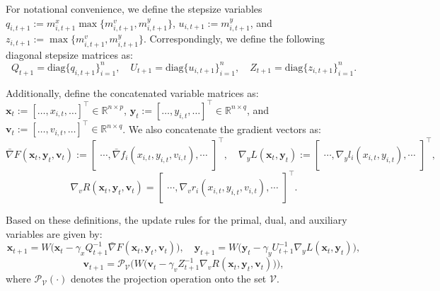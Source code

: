 \documentclass{article}
\theoremstyle{plain}
\theoremstyle{definition}
\theoremstyle{remark}
\begin{document}
For notational convenience, we define the stepsize variables $q_{i,t+1} := m^x_{i,t+1}\max \big\{m^v_{i,t+1}, m^y_{i,t+1}\big\}$, $u_{i,t+1} := m^y_{i,t+1}$, and $z_{i,t+1} := \max \big\{m^v_{i,t+1}, m^y_{i,t+1}\big\}$. Correspondingly, we define the following diagonal stepsize matrices as: 
{\setlength{\abovedisplayskip}{2pt}
\setlength{\belowdisplayskip}{1pt}
\begin{equation*}\label{eq8}
    Q_{t+1} = \text{diag} \big\{q_{i,t+1}\big\}_{i=1}^n, \quad 
U_{t+1} = \text{diag} \big\{u_{i,t+1}\big\}_{i=1}^n,\quad Z_{t+1}= \text{diag} \big\{z_{i,t+1}\big\}_{i=1}^n.\nonumber
\end{equation*}}

Additionally, define the concatenated variable matrices as: $\mathbf{x}_t \!\!:=\!\! [\dots, x_{i,t},\dots]^\top \!\!\!\in\!\! \mathbb{R}^{n \times p}$, $\mathbf{y}_t \!\!:=\!\! [\dots, y_{i,t},\dots]^\top \!\!\!\in\!\! \mathbb{R}^{n \!\times q}$, and $\mathbf{v}_t\! \!:=\!\! [\dots, v_{i,t},\dots]^\top \!\!\!\in\!\! \mathbb{R}^{n \!\times q}$. We also concatenate the gradient vectors as:
{\setlength{\abovedisplayskip}{3pt}
\setlength{\belowdisplayskip}{2pt}
\begin{equation*}
    \bar{\nabla} {F}(\mathbf{x}_t, \mathbf{y}_t, \mathbf{v}_t) :=
    \begin{bmatrix}
         \cdots, \bar{\nabla}f_i(x_{i,t}, y_{i,t}, v_{i,t}),\cdots
    \end{bmatrix}^\top,\quad
    \nabla_y {L}(\mathbf{x}_t, \mathbf{y}_t) :=
    \begin{bmatrix}
        \cdots,  \nabla_yl_i(x_{i,t}, y_{i,t}),\cdots
    \end{bmatrix}^\top,
\end{equation*}
\begin{equation*}
    \!\nabla_v {R}(\mathbf{x}_t, \mathbf{y}_t, \mathbf{v}_t) =
    \begin{bmatrix}
        \cdots,\nabla_v r_i(x_{i,t}, y_{i,t}, v_{i,t}),\cdots
    \end{bmatrix}^\top.
\end{equation*}}

Based on these definitions, the update rules for the primal, dual, and auxiliary variables are given by:
\begin{equation*}
\mathbf{x}_{t+1} = W \Big(\mathbf{x}_t - \gamma_x Q_{t+1}^{-1} \bar{\nabla} F(\mathbf{x}_t, \mathbf{y}_t,\mathbf{v}_t)\Big), \quad
\mathbf{y}_{t+1} = W \big(\mathbf{y}_t - \gamma_y U_{t+1}^{-1} \nabla_y L(\mathbf{x}_t, \mathbf{y}_t)\big),
\end{equation*}
\begin{equation*}
\mathbf{v}_{t+1} = \mathcal{P}_{\mathcal{V}}\Big(W \big(\mathbf{v}_t - \gamma_v Z_{t+1}^{-1} \nabla_v R(\mathbf{x}_t, \mathbf{y}_t,\mathbf{v}_t)\big)\Big),
\end{equation*}
where $\mathcal{P}_{\mathcal{V}}(\cdot)$ denotes the projection operation onto the set $\mathcal{V}$.
\end{document}
